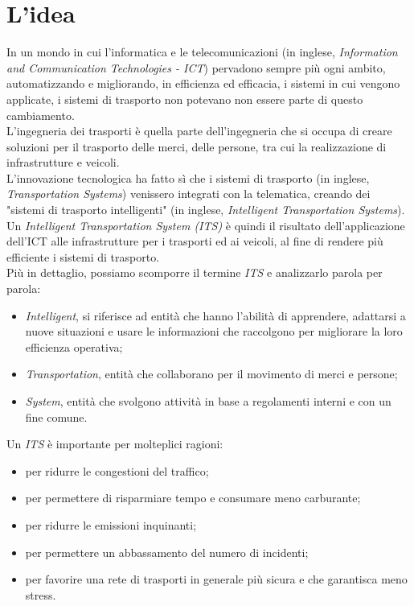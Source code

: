\section{L'idea}
\label{sec:idea}
In un mondo in cui l'informatica e le telecomunicazioni (in inglese, \emph{Information and Communication Technologies - ICT}) pervadono sempre più ogni ambito, automatizzando e migliorando, in efficienza ed efficacia, i sistemi in cui vengono applicate, i sistemi di trasporto non potevano non essere parte di questo cambiamento.\\
L'ingegneria dei trasporti è quella parte dell'ingegneria che si occupa di creare soluzioni per il trasporto delle merci, delle persone, tra cui la realizzazione di infrastrutture e veicoli.\\
L'innovazione tecnologica ha fatto sì che i sistemi di trasporto (in inglese, \emph{Transportation Systems}) venissero integrati con la telematica, creando dei "sistemi di trasporto intelligenti" (in inglese, \emph{Intelligent Transportation Systems}).\\
Un \emph{Intelligent Transportation System (ITS)} è quindi il risultato dell'applicazione dell'ICT alle infrastrutture per i trasporti ed ai veicoli, al fine di rendere più efficiente i sistemi di trasporto.\\
Più in dettaglio, possiamo scomporre il termine \emph{ITS} e analizzarlo parola per parola:
\begin{itemize}
    \item \emph{Intelligent}, si riferisce ad entità che hanno l'abilità di apprendere, adattarsi a nuove situazioni e usare le informazioni che raccolgono per migliorare la loro efficienza operativa;
    \item \emph{Transportation}, entità che collaborano per il movimento di merci e persone;
    \item \emph{System}, entità che svolgono attività in base a regolamenti interni e con un fine comune.
\end{itemize}
Un \emph{ITS} è importante per molteplici ragioni:
\begin{itemize}
    \item per ridurre le congestioni del traffico;
    \item per permettere di risparmiare tempo e consumare meno carburante;
    \item per ridurre le emissioni inquinanti;
    \item per permettere un abbassamento del numero di incidenti;
    \item per favorire una rete di trasporti in generale più sicura e che garantisca meno stress.
\end{itemize}
